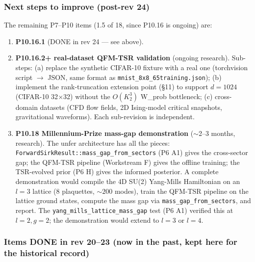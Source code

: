 \documentclass[11pt, a4paper]{article}
\begin{document}
\subsubsection*{Next steps to improve (post-rev 24)}

The remaining P7--P10 items (1.5 of 18, since P10.16 is ongoing)
are:

\begin{enumerate}
\item \textbf{P10.16.1} (DONE in rev 24 --- see above).

\item \textbf{P10.16.2+ real-dataset QFM-TSR validation}
  (ongoing research). Sub-steps: (a) replace the synthetic
  CIFAR-10 fixture with a real one (torchvision script
  $\to$ JSON, same format as \texttt{mnist\_8x8\_65training.json});
  (b) implement the rank-truncation extension point
  (\S11) to support $d=1024$ (CIFAR-10 32$\times$32) without
  the $O(K_2^3)$ W\_prob bottleneck; (c) cross-domain
  datasets (CFD flow fields, 2D Ising-model critical snapshots,
  gravitational waveforms).  Each sub-revision is independent.

\item \textbf{P10.18 Millennium-Prize mass-gap demonstration}
  ($\sim$2--3 months, research). The unfer architecture has all
  the pieces: \texttt{ForwardSirkResult::mass\_gap\_from\_sectors}
  (P6 A1) gives the cross-sector gap; the QFM-TSR pipeline
  (Workstream F) gives the offline training; the TSR-evolved
  prior (P6 H) gives the informed posterior. A complete
  demonstration would compile the 4D SU(2) Yang-Mills Hamiltonian
  on an $l=3$ lattice (8 plaquettes, $\sim 200$ modes), train
  the QFM-TSR pipeline on the lattice ground states, compute
  the mass gap via \texttt{mass\_gap\_from\_sectors}, and report.
  The \texttt{yang\_mills\_lattice\_mass\_gap} test (P6 A1) verified
  this at $l=2, g=2$; the demonstration would extend to $l=3$ or
  $l=4$.
\end{enumerate}

\subsubsection*{Items DONE in rev 20--23 (now in the past, kept here for the historical record)}
\end{document}
